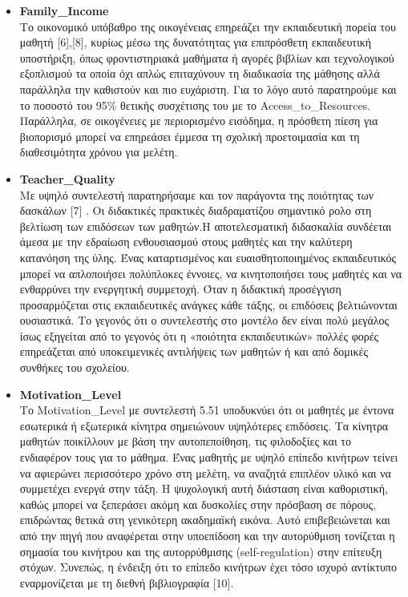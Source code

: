 \documentclass[12pt]{article}
\begin{document}
\begin{itemize}
\item \textbf{Family\_{Income}}\\
Το οικονομικό υπόβαθρο της οικογένειας επηρεάζει την εκπαιδευτική πορεία του μαθητή [6],[8], κυρίως μέσω της δυνατότητας 
για επιπρόσθετη εκπαιδευτική υποστήριξη, όπως φροντιστηριακά μαθήματα ή αγορές βιβλίων και τεχνολογικού εξοπλισμού τα οποία όχι απλώς 
επιταχύνουν τη διαδικασία της μάθησης αλλά παράλληλα την καθιστούν και πιο ευχάριστη. 
Για το λόγο αυτό παρατηρούμε και το ποσοστό του 95\%  θετικής συσχέτισης του με το Access\_{to}\_{Resources}.
Παράλληλα, σε οικογένειες με περιορισμένο εισόδημα, η πρόσθετη πίεση για βιοπορισμό μπορεί να επηρεάσει έμμεσα τη σχολική προετοιμασία και τη διαθεσιμότητα χρόνου για μελέτη.

\item \textbf{Teacher\_{Quality}}\\
Με υψηλό συντελεστή παρατηρήσαμε και τον παράγοντα της ποιότητας των δασκάλων [7] . Οι διδακτικές πρακτικές διαδραματίζου σημαντικό ρολο στη βελτίωση
των επιδόσεων των μαθητών.Η αποτελεσματική διδασκαλία συνδέεται άμεσα με την εδραίωση ενθουσιασμού στους μαθητές και την καλύτερη κατανόηση της ύλης. Ένας καταρτισμένος 
και ευαισθητοποιημένος εκπαιδευτικός μπορεί να απλοποιήσει πολύπλοκες έννοιες, να κινητοποιήσει τους μαθητές και να ενθαρρύνει την ενεργητική συμμετοχή. Όταν η διδακτική
προσέγγιση προσαρμόζεται στις εκπαιδευτικές ανάγκες κάθε τάξης, οι επιδόσεις βελτιώνονται ουσιαστικά. Το γεγονός ότι ο συντελεστής στο μοντέλο δεν είναι πολύ μεγάλος ίσως 
εξηγείται από το γεγονός ότι η «ποιότητα εκπαιδευτικών» πολλές φορές επηρεάζεται από υποκειμενικές αντιλήψεις των μαθητών ή και από δομικές συνθήκες του σχολείου.

\item \textbf{Motivation\_{Level}}\\
Το Motivation\_{Level} με συντελεστή 5.51 υποδυκνύει ότι οι μαθητές με έντονα εσωτερικά ή εξωτερικά κίνητρα σημειώνουν υψηλότερες επιδόσεις. Τα κίνητρα μαθητών ποικίλλουν με 
βάση την αυτοπεποίθηση, τις φιλοδοξίες και το ενδιαφέρον τους για το μάθημα. Ένας μαθητής με υψηλό επίπεδο κινήτρων τείνει να αφιερώνει περισσότερο χρόνο στη μελέτη, να 
αναζητά επιπλέον υλικό και να συμμετέχει ενεργά στην τάξη. Η ψυχολογική αυτή διάσταση είναι καθοριστική, καθώς μπορεί να ξεπεράσει ακόμη και δυσκολίες στην πρόσβαση σε 
πόρους, επιδρώντας θετικά στη γενικότερη ακαδημαϊκή εικόνα. Αυτό επιβεβειώνεται και από την πηγή που αναφέρεται στην υποεπίδοση και την αυτορύθμιση  τονίζεται η σημασία 
του κινήτρου και της αυτορρύθμισης (self-regulation) στην επίτευξη στόχων. Συνεπώς, η ένδειξη ότι το επίπεδο κινήτρων έχει τόσο ισχυρό αντίκτυπο εναρμονίζεται με τη διεθνή βιβλιογραφία [10].


\end{itemize}
\end{document}
